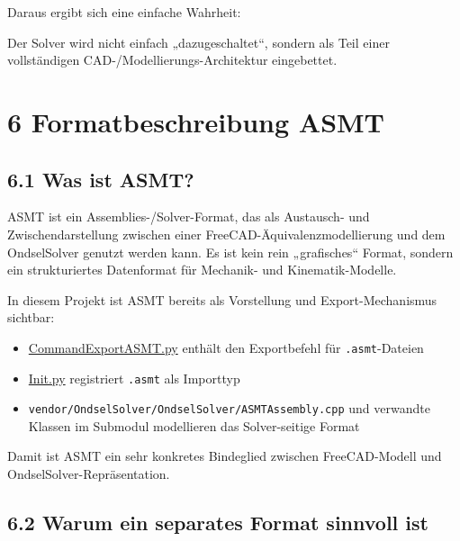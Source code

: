 \documentclass[
  12pt
]{book}
\providecommand{\tightlist}{%
  \setlength{\itemsep}{0pt}\setlength{\parskip}{0pt}}
\begin{document}
Daraus ergibt sich eine einfache Wahrheit:

Der Solver wird nicht einfach „dazugeschaltet``, sondern als Teil einer
vollständigen CAD-/Modellierungs-Architektur eingebettet.

\hypertarget{kap-formatbeschreibung-asmt}{%
\chapter{\texorpdfstring{{6} Formatbeschreibung
ASMT}{6 Formatbeschreibung ASMT}}\label{kap-formatbeschreibung-asmt}}

\hypertarget{was-ist-asmt}{%
\section{\texorpdfstring{{6.1} Was ist
ASMT?}{6.1 Was ist ASMT?}}\label{was-ist-asmt}}

ASMT ist ein Assemblies-/Solver-Format, das als Austausch- und
Zwischendarstellung zwischen einer FreeCAD-Äquivalenzmodellierung und
dem OndselSolver genutzt werden kann. Es ist kein rein „grafisches``
Format, sondern ein strukturiertes Datenformat für Mechanik- und
Kinematik-Modelle.

In diesem Projekt ist ASMT bereits als Vorstellung und
Export-Mechanismus sichtbar:

\begin{itemize}
\tightlist
\item
  \href{https://github.com/FreeCAD/FreeCAD/blob/main/src/Mod/Assembly/CommandExportASMT.py}{CommandExportASMT.py}
  enthält den Exportbefehl für \texttt{.asmt}-Dateien
\item
  \href{https://github.com/FreeCAD/FreeCAD/blob/main/src/Mod/Assembly/Init.py}{Init.py}
  registriert \texttt{.asmt} als Importtyp
\item
  \texttt{vendor/OndselSolver/OndselSolver/ASMTAssembly.cpp} und
  verwandte Klassen im Submodul modellieren das Solver-seitige Format
\end{itemize}

Damit ist ASMT ein sehr konkretes Bindeglied zwischen FreeCAD-Modell und
OndselSolver-Repräsentation.

\hypertarget{warum-ein-separates-format-sinnvoll-ist}{%
\section{\texorpdfstring{{6.2} Warum ein separates Format sinnvoll
ist}{6.2 Warum ein separates Format sinnvoll ist}}\label{warum-ein-separates-format-sinnvoll-ist}}
\end{document}
